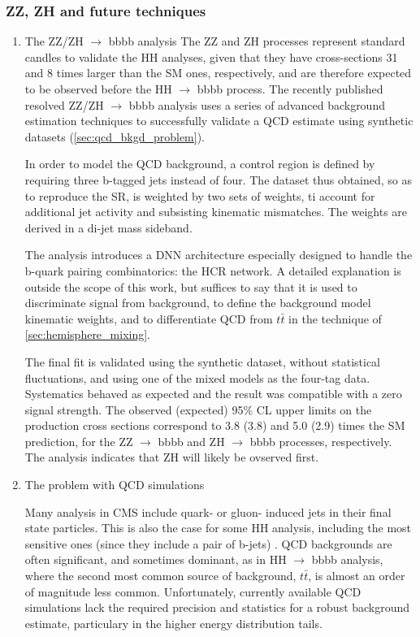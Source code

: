 \documentclass[11pt]{article}
\newcommand{\bbbb}{HH $\rightarrow$ bbbb}
\newcommand{\ttbar}{t\bar{t}}
\newcommand{\zhbbbb}{ZH $\rightarrow$ bbbb}
\newcommand{\zzbbbb}{ZZ $\rightarrow$ bbbb}
\newcommand{\zzzhbbbb}{ZZ\slash ZH $\rightarrow$ bbbb}
\begin{document}
\subsubsection{ZZ, ZH and future techniques}
\label{sec:orgf0c218c}
\begin{enumerate}
\item The \zzzhbbbb{} analysis
\label{sec:orgb7d1a8c}
The ZZ and ZH processes represent standard candles to validate the HH analyses, given that they have cross-sections 31 and 8 times larger than the \ac{SM} ones, respectively, and are therefore expected to be observed before the \bbbb{} process.
The recently published resolved \zzzhbbbb{} analysis \cite{zz_zh_bbbb} uses a series of advanced background estimation techniques to successfully validate a \ac{QCD} estimate using synthetic datasets (\cref{sec:qcd_bkgd_problem}).

In order to model the \ac{QCD} background, a control region is defined by requiring three b-tagged jets instead of four.
The dataset thus obtained, so as to reproduce the \ac{SR}, is weighted by two sets of weights, ti account for additional jet activity and subsisting kinematic mismatches.
The weights are derived in a di-jet mass sideband.

The analysis introduces a \ac{DNN} architecture especially designed to handle the b-quark pairing combinatorics: the \ac{HCR} network.
A detailed explanation is outside the scope of this work, but suffices to say that it is used to discriminate signal from background, to define the background model kinematic weights, and to differentiate \ac{QCD} from \(\ttbar{}\) in the technique of \cref{sec:hemisphere_mixing}.

The final fit is validated using the synthetic dataset, without statistical fluctuations, and using one of the mixed models as the four-tag data. Systematics behaved as expected and the result was compatible with a zero signal strength.
The observed (expected) 95\% CL upper limits on the production cross sections correspond to 3.8 (3.8) and 5.0 (2.9) times the \ac{SM} prediction, for the \zzbbbb{} and \zhbbbb{} processes, respectively.
The analysis indicates that ZH will likely be ovserved first.

\item The problem with \ac{QCD} simulations
\label{sec:org76fdf68}
\label{sec:qcd_bkgd_problem}

Many analysis in CMS include quark- or gluon- induced jets in their final state particles.
This is also the case for some HH analysis, including the most sensitive ones (since they include a pair of b-jets) \cite{higgs_bbtautau_nonres,bbgg_cms,bbbb_resolved_cms,bbbb_boosted_cms}.
\ac{QCD} backgrounds are often significant, and sometimes dominant, as in \bbbb{} analysis, where the second most common source of background, \(\ttbar\), is almost an order of magnitude less common.
Unfortunately, currently available \ac{QCD} simulations lack the required precision and statistics for a robust background estimate, particulary in the higher energy distribution tails.


\end{enumerate}
\end{document}
